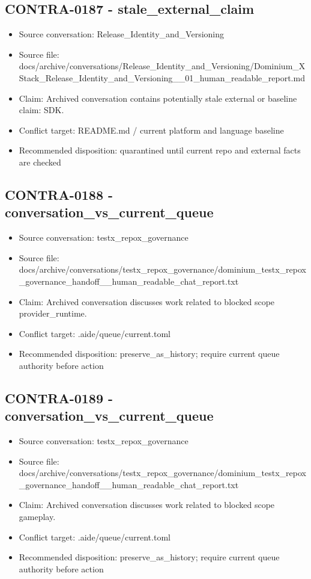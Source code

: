\documentclass[11pt,a4paper]{report}
\begin{document}
\subsection{CONTRA-0187 - stale\_external\_claim}

\begin{itemize}
\item Source conversation: Release\_Identity\_and\_Versioning
\item Source file: docs/archive/conversations/Release\_Identity\_and\_Versioning/Dominium\_XStack\_Release\_Identity\_and\_Versioning\_\_01\_human\_readable\_report.md
\item Claim: Archived conversation contains potentially stale external or baseline claim: SDK.
\item Conflict target: README.md / current platform and language baseline
\item Recommended disposition: quarantined until current repo and external facts are checked
\end{itemize}

\subsection{CONTRA-0188 - conversation\_vs\_current\_queue}

\begin{itemize}
\item Source conversation: testx\_repox\_governance
\item Source file: docs/archive/conversations/testx\_repox\_governance/dominium\_testx\_repox\_governance\_handoff\_\_human\_readable\_chat\_report.txt
\item Claim: Archived conversation discusses work related to blocked scope provider\_runtime.
\item Conflict target: .aide/queue/current.toml
\item Recommended disposition: preserve\_as\_history; require current queue authority before action
\end{itemize}

\subsection{CONTRA-0189 - conversation\_vs\_current\_queue}

\begin{itemize}
\item Source conversation: testx\_repox\_governance
\item Source file: docs/archive/conversations/testx\_repox\_governance/dominium\_testx\_repox\_governance\_handoff\_\_human\_readable\_chat\_report.txt
\item Claim: Archived conversation discusses work related to blocked scope gameplay.
\item Conflict target: .aide/queue/current.toml
\item Recommended disposition: preserve\_as\_history; require current queue authority before action
\end{itemize}
\end{document}
